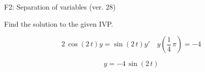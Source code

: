 \begin{exercise}
  \begin{exerciseTitle}F2: Separation of variables (ver. 28)\end{exerciseTitle}
  \begin{exerciseStatement}
    
Find the solution to the given IVP.

    
\[2 \, \cos\left(2 \, t\right) y= \sin\left(2 \, t\right) y'\hspace{1em} y\left( \frac{1}{4} \, \pi \right)= -4\]

  \end{exerciseStatement}
  \begin{exerciseAnswer}
    
\[y= -4 \, \sin\left(2 \, t\right)\]

  \end{exerciseAnswer}
\end{exercise}